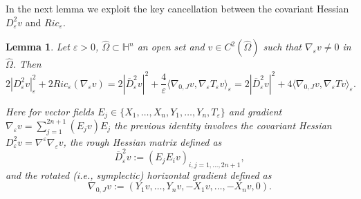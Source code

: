 \documentclass[10pt]{amsart}
\numberwithin{equation}{section}
\newtheorem{lemma}[theorem]{Lemma}
\theoremstyle{definition}
\newcommand{\He}{\mathbb{H}}
\begin{document}
In the next lemma we exploit the key cancellation between the covariant Hessian $D^2_\varepsilon v$ and $Ric_\varepsilon$.  


\begin{lemma}\label{Hessian-rough} Let $\varepsilon >0$, $\widehat{\Omega} \subset \He^n$ an open set and $v\in C^2(\widehat{\Omega})$ such that $\nabla_\varepsilon v \neq 0$ in $\widehat{\Omega}$. Then 
	\begin{equation}
		\label{Hessian-lb}
		2|D^2_\varepsilon v |_\varepsilon^2 +2 Ric_\varepsilon(\nabla_\varepsilon v) = 2|\overline{D}^2_{\varepsilon}v|^2 + \dfrac{4}{\varepsilon} \langle \nabla_{0,J}v, \nabla_{\varepsilon}T_{\varepsilon}v \rangle_{\varepsilon} = 2|\overline{D}^2_{\varepsilon}v|^2 + 4 \langle \nabla_{0,J}v, \nabla_{\varepsilon}T v \rangle_{\varepsilon}.
	\end{equation}
	
Here for vector fields
$E_j \in \{X_1, \ldots, X_n, Y_1, \ldots ,Y_n,T_\varepsilon \}$ and gradient $\nabla_\varepsilon v=\sum_{j=1}^{2n+1} (E_jv) E_j$ the previous identity involves the covariant Hessian $D^2_\varepsilon v=\nabla^\varepsilon  \nabla_\varepsilon v$, the {\it rough Hessian matrix} defined as
\begin{equation}
\label{rough-Hessian}
	\overline{D}^2_{\varepsilon}v := (E_j E_i v)_{i,j=1,\ldots,2n+1},
\end{equation}
and the rotated (i.e., symplectic) horizontal gradient defined as 
\begin{equation}\label{eq:Grad_simplettico}
	\nabla_{0,J}v := (Y_1 v, \ldots, Y_n v, -X_1 v, \ldots, -X_n v, 0).
\end{equation}
\end{lemma}
\end{document}
